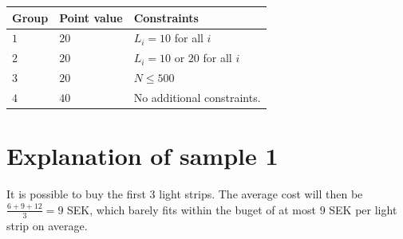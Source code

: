 \noindent
\begin{tabular}{| l | l | p{12cm} |}
  \hline
  \textbf{Group} & \textbf{Point value} & \textbf{Constraints} \\ \hline
  $1$    & $20$       & $L_i=10$ for all $i$ \\ \hline
  $2$    & $20$       & $L_i=10$ or $20$ for all $i$ \\ \hline
  $3$    & $20$       & $N \leq 500$ \\ \hline
  $4$    & $40$       & No additional constraints. \\ \hline
\end{tabular}

\section*{Explanation of sample 1}
It is possible to buy the first 3 light strips.
The average cost will then be $\frac{6+9+12}{3}=9$ SEK, which barely fits within the buget of at most $9$ SEK per light strip on average.
